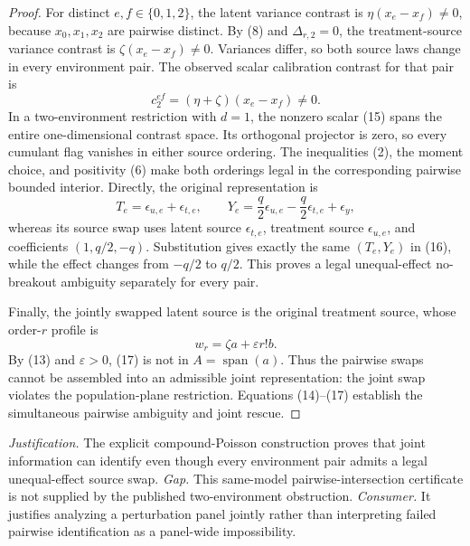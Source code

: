 \documentclass{article}
\begin{document}
\begin{proof}
For distinct \(e,f\in\{0,1,2\}\), the latent variance contrast is \(\eta(x_e-x_f)\neq0\), because \(x_0,x_1,x_2\) are pairwise distinct.  By (8) and \(\Delta_{r,2}=0\), the treatment-source variance contrast is \(\zeta(x_e-x_f)\neq0\).  Variances differ, so both source laws change in every environment pair.  The observed scalar calibration contrast for that pair is
\[
 c_2^{ef}=(\eta+\zeta)(x_e-x_f)\neq0.                                    \tag{15}
\]
In a two-environment restriction with \(d=1\), the nonzero scalar (15) spans the entire one-dimensional contrast space.  Its orthogonal projector is zero, so every cumulant flag vanishes in either source ordering.  The inequalities (2), the moment choice, and positivity (6) make both orderings legal in the corresponding pairwise bounded interior.  Directly, the original representation is
\[
 T_e=\epsilon_{u,e}+\epsilon_{t,e},
 \qquad
 Y_e=\frac q2\epsilon_{u,e}-\frac q2\epsilon_{t,e}+\epsilon_y,           \tag{16}
\]
whereas its source swap uses latent source \(\epsilon_{t,e}\), treatment source \(\epsilon_{u,e}\), and coefficients \((1,q/2,-q)\).  Substitution gives exactly the same \((T_e,Y_e)\) in (16), while the effect changes from \(-q/2\) to \(q/2\).  This proves a legal unequal-effect no-breakout ambiguity separately for every pair.

Finally, the jointly swapped latent source is the original treatment source, whose order-\(r\) profile is
\[
 w_r=\zeta a+\varepsilon r!b.                                             \tag{17}
\]
By (13) and \(\varepsilon>0\), (17) is not in \(A=\operatorname{span}(a)\).  Thus the pairwise swaps cannot be assembled into an admissible joint representation: the joint swap violates the population-plane restriction.  Equations (14)--(17) establish the simultaneous pairwise ambiguity and joint rescue.
\end{proof}
\par\smallskip\noindent \textit{Justification.} The explicit compound-Poisson construction proves that joint information can identify even though every environment pair admits a legal unequal-effect source swap. \textit{Gap.} This same-model pairwise-intersection certificate is not supplied by the published two-environment obstruction. \textit{Consumer.} It justifies analyzing a perturbation panel jointly rather than interpreting failed pairwise identification as a panel-wide impossibility.
\end{document}

